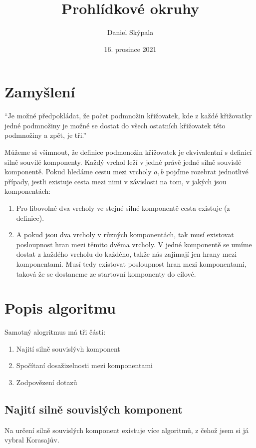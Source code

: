 \documentclass{article}
\title{Prohlídkové okruhy}
\author{Daniel Skýpala}
\date{16. prosince 2021}
\begin{document}
\maketitle
{}
\section{Zamyšlení}

``Je možné předpokládat, že počet podmnožin křižovatek, kde z každé křižovatky jedné
podmnožiny je možné se dostat do všech ostatních křižovatek této podmnožiny a zpět, je tři.''

Můžeme si všimnout, že definice podmonožin křižovatek je ekvivalentní s definicí silně souvilé komponenty.
Každý vrchol leží v jedné právě jedné silně souvislé komponentě. Pokud hledáme cestu mezi vrcholy \(a, b\)
pojďme rozebrat jednotlivé případy, jestli existuje cesta mezi nimi v závislosti na tom,
v jakých jsou komponentách:

\begin{enumerate}
    \item Pro libovolné dva vrcholy ve stejné silné komponentě cesta existuje (z definice).
    
    \item A pokud jsou dva vrcholy v různých komponentách, tak musí existovat posloupnost hran mezi těmito dvěma vrcholy.
    V jedné komponentě se umíme dostat z každého vrcholu do každého, takže nás zajímají jen hrany mezi komponentami.
    Musí tedy existovat posloupnost hran mezi komponentami, taková že se dostaneme ze startovní komponenty do cílové.
    
\end{enumerate}
\section{Popis algoritmu}
Samotný alogritmus má tři části:
\begin{enumerate}
    \item Najití silně souvislývh komponent
    \item Spočítaní dosažizelnosti mezi komponentami
    \item Zodpovězení dotazů
\end{enumerate}

\subsection{Najití silně souvislých komponent}
Na určení silně souvislých komponent existuje více algoritmů, z čehož jsem si já vybral Korasajův.
\end{document}

